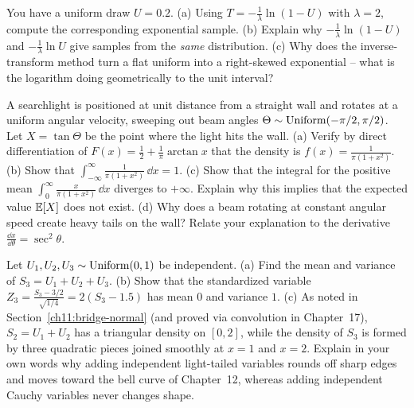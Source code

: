 \begin{exercise}
\label{ch11:exr-invtransform}
You have a uniform draw $U=0.2$. (a) Using $T=-\tfrac{1}{\lambda}\ln(1-U)$ with
$\lambda=2$, compute the corresponding exponential sample. (b) Explain why
$-\tfrac{1}{\lambda}\ln(1-U)$ and $-\tfrac{1}{\lambda}\ln U$ give samples from
the \emph{same} distribution. (c) Why does the inverse-transform method turn a
flat uniform into a right-skewed exponential -- what is the logarithm doing
geometrically to the unit interval?
\end{exercise}

\begin{exercise}
\label{ch11:exr-cauchy}
A searchlight is positioned at unit distance from a straight wall and rotates at
a uniform angular velocity, sweeping out beam angles $\Theta \sim \operatorname{Uniform}(-\pi/2, \pi/2)$.
Let $X = \tan \Theta$ be the point where the light hits the wall.
(a) Verify by direct differentiation of $F(x) = \frac{1}{2} + \frac{1}{\pi}\arctan x$
that the density is $f(x) = \frac{1}{\pi(1+x^2)}$.
(b) Show that $\int_{-\infty}^\infty \frac{1}{\pi(1+x^2)}\,\dd x = 1$.
(c) Show that the integral for the positive mean $\int_0^\infty \frac{x}{\pi(1+x^2)}\,\dd x$
diverges to $+\infty$. Explain why this implies that the expected value $\operatorname{\mathbb{E}}[X]$ does not exist.
(d) Why does a beam rotating at constant angular speed create heavy tails on the
wall? Relate your explanation to the derivative $\frac{\dd x}{\dd\theta} = \sec^2\theta$.
\end{exercise}

\begin{exercise}
\label{ch11:exr-sumunif-bell}
Let $U_1, U_2, U_3 \sim \operatorname{Uniform}(0,1)$ be independent.
(a) Find the mean and variance of $S_3 = U_1 + U_2 + U_3$.
(b) Show that the standardized variable $Z_3 = \frac{S_3 - 3/2}{\sqrt{1/4}} = 2(S_3 - 1.5)$
has mean $0$ and variance $1$.
(c) As noted in Section~\ref{ch11:bridge-normal} (and proved via convolution in
Chapter~17), $S_2 = U_1 + U_2$ has a triangular density on $[0,2]$, while the density
of $S_3$ is formed by three quadratic pieces joined smoothly at $x=1$ and $x=2$.
Explain in your own words why adding independent light-tailed variables rounds off
sharp edges and moves toward the bell curve of Chapter~12, whereas adding independent
Cauchy variables never changes shape.
\end{exercise}
